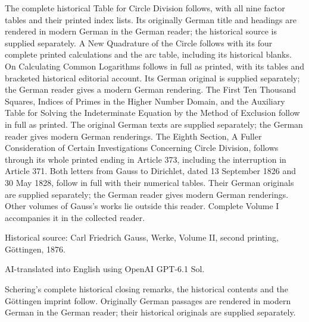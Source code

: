 \begin{titlepage}
\begin{minipage}{0.98\linewidth}\small
The complete historical Table for Circle Division follows, with all nine factor tables and their printed index lists. Its originally German title and headings are rendered in modern German in the German reader; the historical source is supplied separately. A New Quadrature of the Circle follows with its four complete printed calculations and the arc table, including its historical blanks. On Calculating Common Logarithms follows in full as printed, with its tables and bracketed historical editorial account. Its German original is supplied separately; the German reader gives a modern German rendering. The First Ten Thousand Squares, Indices of Primes in the Higher Number Domain, and the Auxiliary Table for Solving the Indeterminate Equation by the Method of Exclusion follow in full as printed. The original German texts are supplied separately; the German reader gives modern German renderings. The Eighth Section, A Fuller Consideration of Certain Investigations Concerning Circle Division, follows through its whole printed ending in Article 373, including the interruption in Article 371. Both letters from Gauss to Dirichlet, dated 13 September 1826 and 30 May 1828, follow in full with their numerical tables. Their German originals are supplied separately; the German reader gives modern German renderings. Other volumes of Gauss’s works lie outside this reader. Complete Volume I accompanies it in the collected reader.

Historical source: Carl Friedrich Gauss, Werke, Volume II, second printing, Göttingen, 1876.

AI-translated into English using OpenAI GPT-6.1 Sol.

\par  Schering’s complete historical closing remarks, the historical contents and the Göttingen imprint follow. Originally German passages are rendered in modern German in the German reader; their historical originals are supplied separately.
\end{minipage}\end{titlepage}
